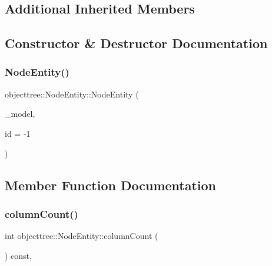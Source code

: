 \subsection*{Additional Inherited Members}


\subsection{Constructor \& Destructor Documentation}
\mbox{\label{classobjecttree_1_1_node_entity_ad70df4ceddd7e79f626f62c37e12fca3}} 
\subsubsection{\texorpdfstring{NodeEntity()}{NodeEntity()}}
{\footnotesize\ttfamily objecttree\+::\+Node\+Entity\+::\+Node\+Entity (\begin{DoxyParamCaption}\item[{\mbox{\hyperlink{class_object_tree_model}{Object\+Tree\+Model}} $\ast$}]{\+\_\+model,  }\item[{int}]{id = {\ttfamily -\/1} }\end{DoxyParamCaption})}



\subsection{Member Function Documentation}
\mbox{\label{classobjecttree_1_1_node_entity_a9429614bf6e56a4a1bcc67403f7733b0}} 
\subsubsection{\texorpdfstring{columnCount()}{columnCount()}}
{\footnotesize\ttfamily int objecttree\+::\+Node\+Entity\+::column\+Count (\begin{DoxyParamCaption}{ }\end{DoxyParamCaption}) const\hspace{0.3cm}{\ttfamily [override]}, {\ttfamily [virtual]}}



